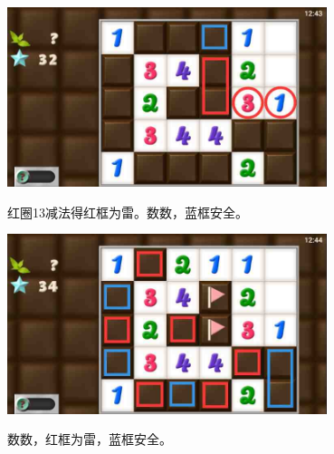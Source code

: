 \begin{center}
    \includegraphics[width=0.7\textwidth]{puzzlelow/225-3.jpg}
\end{center}
红圈13减法得红框为雷。数数，蓝框安全。
\begin{center}
    \includegraphics[width=0.7\textwidth]{puzzlelow/225-4.jpg}
\end{center}
数数，红框为雷，蓝框安全。

